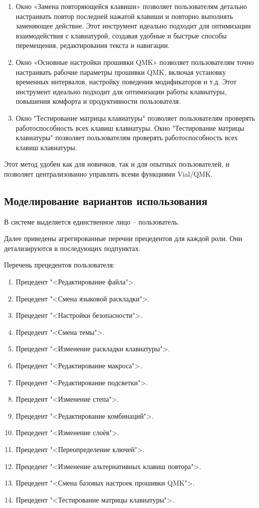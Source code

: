 \begin{enumerate}
\item Окно «Замена повторяющейся клавиши» позволяет пользователям детально настраивать повтор последней нажатой клавиши и повторно выполнять заменяющее действие. Этот инструмент идеально подходит для оптимизации взаимодействия с клавиатурой, создавая удобные и быстрые способы перемещения, редактирования текста и навигации.
\item Окно «Основные настройки прошивки QMK» позволяет пользователям точно настраивать рабочие параметры прошивки QMK, включая установку временных интервалов, настройку поведения модификаторов и т.д. Этот инструмент идеально подходит для оптимизации работы клавиатуры, повышения комфорта и продуктивности пользователя.
\item Окно "Тестирование матрицы клавиатуры" позволяет пользователям проверять работоспособность всех клавиш клавиатуры. Окно "Тестирование матрицы клавиатуры" позволяет пользователям проверять работоспособность всех клавиш клавиатуры.
\end{enumerate}

Этот метод удобен как для новичков, так и для опытных пользователей, и позволяет централизованно управлять всеми функциями Vial/QMK.

\subsection{Моделирование вариантов использования}

В системе выделяется единственное лицо – пользователь.

Далее приведены агрегированные перечни прецедентов для каждой роли. Они детализируются в последующих подпунктах.

Перечень прецедентов пользователя:

\begin{enumerate}
\item Прецедент "<Редактирование файла">.
\item Прецедент "<Смена языковой раскладки">.
\item Прецедент "<Настройки безопасности">.
\item Прецедент "<Смена темы">.
\item Прецедент "<Изменение раскладки клавиатуры">.
\item Прецедент "<Редактирование макроса">.
\item Прецедент "<Редактирование подсветки">.
\item Прецедент "<Изменение степа">.
\item Прецедент "<Редактирование комбинаций">.
\item Прецедент "<Изменение слоёв">.
\item Прецедент "<Переопределение ключей">.
\item Прецедент "<Изменение альтернативных клавиш повтора">.
\item Прецедент "<Смена базовых настроек прошивки QMK">. 
\item Прецедент "<Тестирование матрицы клавиатуры">.
\end{enumerate}

